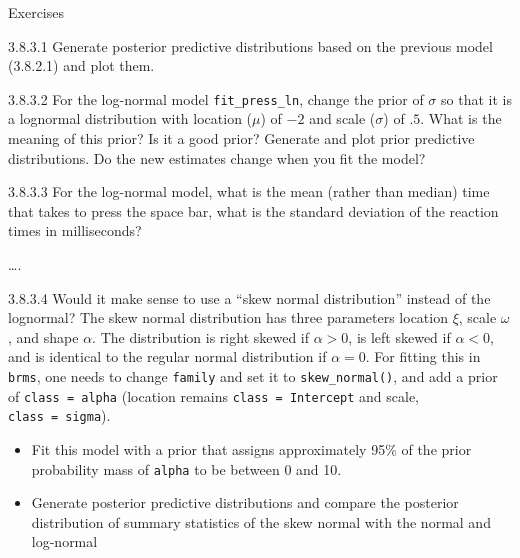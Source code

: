 \documentclass[12pt,ignorenonframetext,aspectratio=169]{beamer}
\begin{document}
\begin{frame}[fragile]

\begin{block}{\color{blue} Exercises}

3.8.3.1 Generate posterior predictive distributions based on the previous model (3.8.2.1) and plot them.

3.8.3.2 For the log-normal model \texttt{fit\_press\_ln}, change the prior of \(\sigma\) so that it is a lognormal distribution with location (\(\mu\)) of \(-2\) and scale (\(\sigma\)) of \(.5\). What is the meaning of this prior? Is it a good prior? Generate and plot prior predictive distributions. Do the new estimates change when you fit the model?

3.8.3.3 For the log-normal model, what is the mean (rather than median) time that takes to press the space bar, what is the standard deviation of the reaction times in milliseconds?

\ldots{}.

\end{block}

\end{frame}

\begin{frame}[fragile]

3.8.3.4 Would it make sense to use a ``skew normal distribution'' instead of the lognormal? The skew normal distribution has three parameters location \(\xi\), scale \(\omega\), and shape \(\alpha\). The distribution is right skewed if \(\alpha >0\), is left skewed if \(\alpha <0\), and is identical to the regular normal distribution if \(\alpha =0\). For fitting this in \texttt{brms}, one needs to change \texttt{family} and set it to \texttt{skew\_normal()}, and add a prior of \texttt{class\ =\ alpha} (location remains \texttt{class\ =\ Intercept} and scale, \texttt{class\ =\ sigma}).

\begin{itemize}
\item
  Fit this model with a prior that assigns approximately 95\% of the prior probability mass of \texttt{alpha} to be between 0 and 10.
\item
  Generate posterior predictive distributions and compare the posterior distribution of summary statistics of the skew normal with the normal and log-normal
\end{itemize}

\end{frame}
\end{document}
